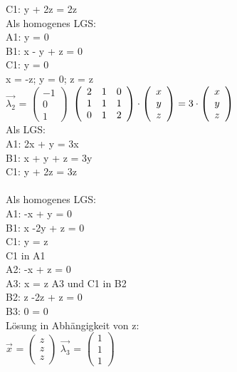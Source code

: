 \documentclass{article}
\begin{document}
	C1: y + 2z = 2z \\
	Als homogenes LGS: \\
	A1: y = 0 \\
	B1: x - y + z = 0 \\
	C1: y = 0 \\
	x = -z; y = 0; z = z  \\
	$\vec{\lambda_{2}}$ =
	$\left(
	\begin{array}{c}
	-1 \\ 0 \\ 1 
	\end{array}
	\right)$
	$ \\ \\
	\left(
	\begin{array}{ccc}
	2&1&0 \\ 1&1&1 \\ 0&1&2 
	\end{array}
	\right)
	\cdot
	\left(
	\begin{array}{c}
	x \\ y \\ z
	\end{array}
	\right)
	=
	3 \cdot
	\left(
	\begin{array}{c}
	x \\ y \\ z
	\end{array}
	\right)
	$ \\
	Als LGS:  \\
	A1: 2x + y = 3x \\
	B1: x + y + z = 3y \\
	C1: y + 2z = 3z \\ \\
	Als homogenes LGS: \\
	A1: -x + y = 0 \\
	B1: x -2y + z = 0 \\
	C1: y = z \\
	C1 in A1 \\
	A2: -x + z = 0 \\
	A3: x = z
	A3 und C1 in B2 \\
	B2: z -2z + z = 0 \\
	B3: 0 = 0 \\
	Lösung in Abhängigkeit von z: \\
	$\vec{x}$ = 
	$\left(
	\begin{array}{c}
	z \\ z\\ z
	\end{array}
	\right)$
	$\vec{\lambda_{3}}$ =
	$\left(
	\begin{array}{c}
	1 \\ 1 \\1
	\end{array}
	\right)$
\end{document}
